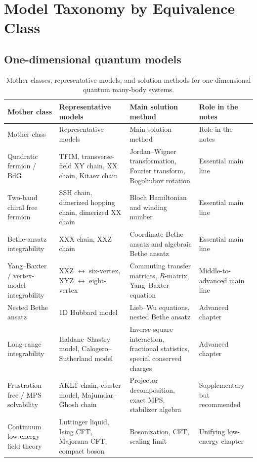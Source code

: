 \documentclass[12pt,openany]{book}
\theoremstyle{definition}
\theoremstyle{plain}
\begin{document}
\chapter{Model Taxonomy by Equivalence Class}

\section{One-dimensional quantum models}

{\footnotesize\setlength{\tabcolsep}{3pt}\begin{longtable}{L{0.20\textwidth}L{0.24\textwidth}L{0.27\textwidth}L{0.16\textwidth}}
\caption{Mother classes, representative models, and solution methods for one-dimensional quantum many-body systems.}\label{tab:1d-quantum-taxonomy}\\
\toprule
Mother class & Representative models & Main solution method & Role in the notes \\
\midrule
\endfirsthead
\toprule
Mother class & Representative models & Main solution method & Role in the notes \\
\midrule
\endhead
Quadratic fermion / BdG & TFIM, transverse-field XY chain, XX chain, Kitaev chain & Jordan--Wigner transformation, Fourier transform, Bogoliubov rotation & Essential main line \\
Two-band chiral free fermion & SSH chain, dimerized hopping chain, dimerized XX chain & Bloch Hamiltonian and winding number & Essential main line \\
Bethe-ansatz integrability & XXX chain, XXZ chain & Coordinate Bethe ansatz and algebraic Bethe ansatz & Essential main line \\
Yang--Baxter / vertex-model integrability & XXZ $\leftrightarrow$ six-vertex, XYZ $\leftrightarrow$ eight-vertex & Commuting transfer matrices, $R$-matrix, Yang--Baxter equation & Middle-to-advanced main line \\
Nested Bethe ansatz & 1D Hubbard model & Lieb--Wu equations, nested Bethe ansatz & Advanced chapter \\
Long-range integrability & Haldane--Shastry model, Calogero--Sutherland model & Inverse-square interaction, fractional statistics, special conserved charges & Advanced chapter \\
Frustration-free / MPS solvability & AKLT chain, cluster model, Majumdar--Ghosh chain & Projector decomposition, exact MPS, stabilizer algebra & Supplementary but recommended \\
Continuum low-energy field theory & Luttinger liquid, Ising CFT, Majorana CFT, compact boson & Bosonization, CFT, scaling limit & Unifying low-energy chapter \\
\bottomrule
\end{longtable}}
\end{document}
